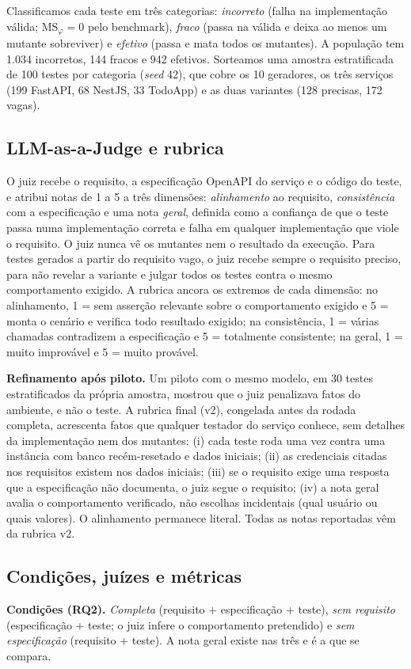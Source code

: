 \documentclass[sigconf,nonacm]{acmart}
\newcommand{\msphi}{MS$_\varphi$}
\begin{document}
Classificamos cada teste em três categorias: \emph{incorreto} (falha na implementação válida; \msphi{}$=0$
pelo benchmark), \emph{fraco} (passa na válida e deixa ao menos um mutante sobreviver) e \emph{efetivo}
(passa e mata todos os mutantes). A população tem 1.034 incorretos, 144 fracos e 942 efetivos. Sorteamos
uma amostra estratificada de 100 testes por categoria (\emph{seed} 42), que cobre os 10 geradores, os três
serviços (199 FastAPI, 68 NestJS, 33 TodoApp) e as duas variantes (128 precisas, 172 vagas).

\subsection{LLM-as-a-Judge e rubrica}
O juiz recebe o requisito, a especificação OpenAPI do serviço e o código do teste, e atribui notas de 1 a 5
a três dimensões: \emph{alinhamento} ao requisito, \emph{consistência} com a especificação e uma nota
\emph{geral}, definida como a confiança de que o teste passa numa implementação correta e falha em qualquer
implementação que viole o requisito. O juiz nunca vê os mutantes nem o resultado da execução. Para testes
gerados a partir do requisito vago, o juiz recebe sempre o requisito preciso, para não revelar a variante e julgar
todos os testes contra o mesmo comportamento exigido. A rubrica ancora os extremos de cada dimensão: no
alinhamento, 1 = sem asserção relevante sobre o comportamento exigido e 5 = monta o cenário e verifica todo
resultado exigido; na consistência, 1 = várias chamadas contradizem a especificação e 5 = totalmente
consistente; na geral, 1 = muito improvável e 5 = muito provável.

\textbf{Refinamento após piloto.} Um piloto com o mesmo modelo, em 30 testes estratificados da própria
amostra, mostrou que o juiz penalizava fatos do ambiente, e não o teste. A rubrica final (v2), congelada antes
da rodada completa, acrescenta fatos que qualquer testador do serviço conhece, sem detalhes da implementação
nem dos mutantes: (i) cada teste roda uma vez contra uma
instância com banco recém-resetado e dados iniciais; (ii) as credenciais citadas nos requisitos existem nos
dados iniciais; (iii) se o requisito exige uma resposta que a especificação não documenta, o juiz segue o
requisito; (iv) a nota geral avalia o comportamento verificado, não escolhas incidentais (qual usuário ou
quais valores). O alinhamento permanece literal. Todas as notas reportadas vêm da rubrica v2.

\subsection{Condições, juízes e métricas}
\textbf{Condições (RQ2).} \emph{Completa} (requisito + especificação + teste), \emph{sem requisito}
(especificação + teste; o juiz infere o comportamento pretendido) e \emph{sem especificação}
(requisito + teste). A nota geral existe nas três e é a que se compara.
\end{document}
